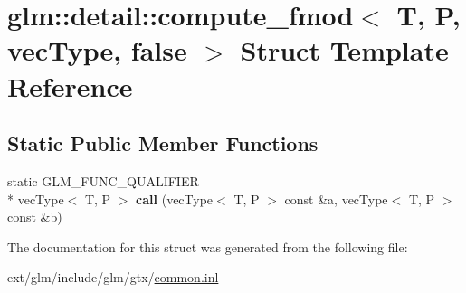\hypertarget{structglm_1_1detail_1_1compute__fmod_3_01_t_00_01_p_00_01vec_type_00_01false_01_4}{\section{glm\-:\-:detail\-:\-:compute\-\_\-fmod$<$ T, P, vec\-Type, false $>$ Struct Template Reference}
\label{structglm_1_1detail_1_1compute__fmod_3_01_t_00_01_p_00_01vec_type_00_01false_01_4}
}
\subsection*{Static Public Member Functions}
\begin{DoxyCompactItemize}
\item 
\hypertarget{structglm_1_1detail_1_1compute__fmod_3_01_t_00_01_p_00_01vec_type_00_01false_01_4_aba714e77ed7c4a97b9978c1c09fd6472}{static G\-L\-M\-\_\-\-F\-U\-N\-C\-\_\-\-Q\-U\-A\-L\-I\-F\-I\-E\-R \\*
vec\-Type$<$ T, P $>$ {\bfseries call} (vec\-Type$<$ T, P $>$ const \&a, vec\-Type$<$ T, P $>$ const \&b)}\label{structglm_1_1detail_1_1compute__fmod_3_01_t_00_01_p_00_01vec_type_00_01false_01_4_aba714e77ed7c4a97b9978c1c09fd6472}

\end{DoxyCompactItemize}


The documentation for this struct was generated from the following file\-:\begin{DoxyCompactItemize}
\item 
ext/glm/include/glm/gtx/\hyperlink{common_8inl}{common.\-inl}\end{DoxyCompactItemize}
